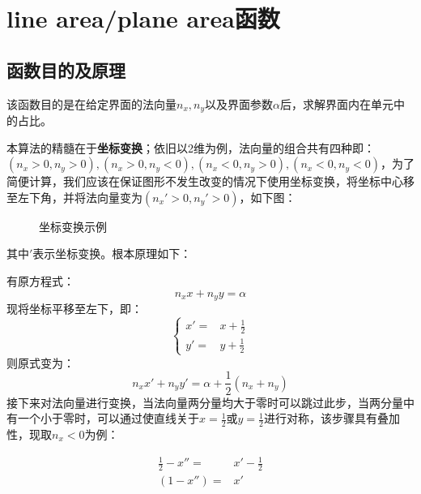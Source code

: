 \documentclass[lang=cn,11pt,a4paper]{elegantpaper}
\begin{document}
\section{line area/plane area函数}
\subsection{函数目的及原理}
该函数目的是在给定界面的法向量$n_x,n_y$以及界面参数$\alpha$后，求解界面内在单元中的占比。\par
本算法的精髓在于\textbf{坐标变换}；依旧以2维为例，法向量的组合共有四种即：$(n_x>0,n_y>0),(n_x>0,n_y<0),(n_x<0,n_y>0),(n_x<0,n_y<0)$，为了简便计算，我们应该在保证图形不发生改变的情况下使用坐标变换，将坐标中心移至左下角，并将法向量变为$(n_x'>0,n_y'>0)$，如下图：\par
\begin{figure}[htbp]
    \centering
    \begin{center}
    \end{center}
    \caption{坐标变换示例}
    \label{fig:pianyi1}
\end{figure}
其中$'$表示坐标变换。根本原理如下：\par
有原方程式：
\begin{equation}
    n_xx+n_yy=\alpha
\end{equation}
现将坐标平移至左下，即：
\begin{equation}
    \left\{ 
    \begin{array}{cc}
    x'=&x+\frac{1}{2}\\
    y'=&y+\frac{1}{2}
    \end{array}
    \right.
\end{equation}
则原式变为：
\begin{equation}
    n_xx'+n_yy'=\alpha+\frac{1}{2}(n_x+n_y)
\end{equation}
接下来对法向量进行变换，当法向量两分量均大于零时可以跳过此步，当两分量中有一个小于零时，可以通过使直线关于$x=\frac{1}{2}$或$y=\frac{1}{2}$进行对称，该步骤具有叠加性，现取$n_x<0$为例：\par
\begin{align}
    \frac{1}{2}-x''=&x'-\frac{1}{2}\\
    (1-x'')=&x'
\end{align}
\end{document}
